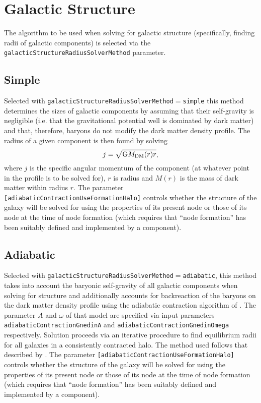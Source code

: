 \section{Galactic Structure}

The algorithm to be used when solving for galactic structure (specifically, finding radii of galactic components) is selected via the {\tt galacticStructureRadiusSolverMethod} parameter.

\subsection{Simple}

Selected with {\tt galacticStructureRadiusSolverMethod}$=${\tt simple} this method determines the sizes of galactic components by assuming that their self-gravity is negligible (i.e. that the gravitational potential well is dominated by dark matter) and that, therefore, baryons do not modify the dark matter density profile. The radius of a given component is then found by solving
\begin{equation}
 j = \sqrt{\G M_{\rm DM}(r) r},
\end{equation}
where $j$ is the specific angular momentum of the component (at whatever point in the profile is to be solved for), $r$ is radius and $M(r)$ is the mass of dark matter within radius $r$. The parameter {\tt [adiabaticContractionUseFormationHalo]} controls whether the structure of the galaxy will be solved for using the properties of its present node or those of its node at the time of node formation (which requires that ``node formation'' has been suitably defined and implemented by a component).

\subsection{Adiabatic}

Selected with {\tt galacticStructureRadiusSolverMethod}$=${\tt adiabatic}, this method takes into account the baryonic self-gravity of all galactic components when solving for structure and additionally accounts for backreaction of the baryons on the dark matter density profile using the adiabatic contraction algorithm of \cite{gnedin_response_2004}. The parameter $A$ and $\omega$ of that model are specified via input parameters {\tt adiabaticContractionGnedinA} and {\tt adiabaticContractionGnedinOmega} respectively. Solution proceeds via an iterative procedure to find equilibrium radii for all galaxies in a consistently contracted halo. The method used follows that described by \cite{benson_galaxy_2010}. The parameter {\tt [adiabaticContractionUseFormationHalo]} controls whether the structure of the galaxy will be solved for using the properties of its present node or those of its node at the time of node formation (which requires that ``node formation'' has been suitably defined and implemented by a component).

